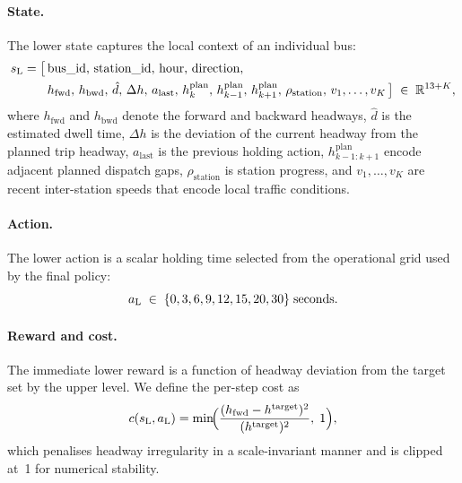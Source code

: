 \paragraph{State.}
The lower state captures the local context of an individual bus:
\begin{equation}
  \label{eq:lower_state}
  \begin{aligned}
    s_{\mathrm{L}} = \bigl[\,
      &\text{bus\_id},\,
       \text{station\_id},\,
       \text{hour},\,
       \text{direction},\\
      &h_{\mathrm{fwd}},\,
       h_{\mathrm{bwd}},\,
       \hat{d},\,
       \Delta h,\,
       a_{\mathrm{last}},\,
       h^{\mathrm{plan}}_k,\,
       h^{\mathrm{plan}}_{k-1},\,
       h^{\mathrm{plan}}_{k+1},\,
       \rho_{\mathrm{station}},\,
       v_1,\dots,v_K
    \,\bigr] \;\in\; \mathbb{R}^{13+K},
  \end{aligned}
\end{equation}
where $h_{\mathrm{fwd}}$ and $h_{\mathrm{bwd}}$ denote the forward and backward headways, $\hat{d}$ is the estimated dwell time, $\Delta h$ is the deviation of the current headway from the planned trip headway, $a_{\mathrm{last}}$ is the previous holding action, $h^{\mathrm{plan}}_{k-1:k+1}$ encode adjacent planned dispatch gaps, $\rho_{\mathrm{station}}$ is station progress, and $v_1,\dots,v_K$ are recent inter-station speeds that encode local traffic conditions.

\paragraph{Action.}
The lower action is a scalar holding time selected from the operational grid used by the final policy:
\begin{equation}
  \label{eq:lower_action}
  a_{\mathrm{L}} \;\in\; \{0,3,6,9,12,15,20,30\}\;\text{seconds}.
\end{equation}

\paragraph{Reward and cost.}
The immediate lower reward is a function of headway deviation from the target set by the upper level.
We define the per-step cost as
\begin{equation}
  \label{eq:lower_cost}
  c(s_{\mathrm{L}},a_{\mathrm{L}}) = \min\!\Bigl(\frac{(h_{\mathrm{fwd}} - h^{\mathrm{target}})^{2}}{(h^{\mathrm{target}})^{2}},\;1\Bigr),
\end{equation}
which penalises headway irregularity in a scale-invariant manner and is clipped at~1 for numerical stability.

